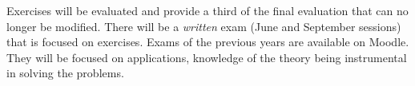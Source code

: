 Exercises will be evaluated and provide a third of the final evaluation
that can no longer be modified. There will be a \emph{written} exam
(June and September sessions) that is focused on exercises. Exams of the
previous years are available on Moodle. They will be focused on
applications, knowledge of the theory being instrumental in solving the
problems.
